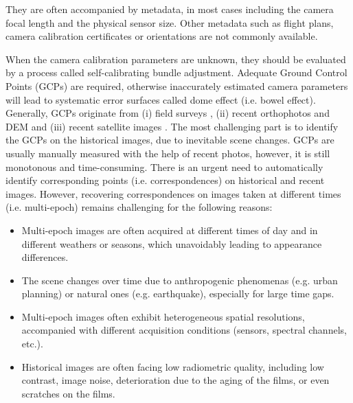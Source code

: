 They are often accompanied by metadata, in most cases including the camera focal length and the physical sensor size. Other metadata such as flight plans, camera calibration certificates or orientations are not commonly available. 
\par
When the camera calibration parameters are unknown, they should be evaluated by a process called self-calibrating bundle adjustment. Adequate Ground Control Points (GCPs) are required, otherwise inaccurately estimated camera parameters will lead to systematic error surfaces called dome effect (i.e. bowel effect).
Generally, GCPs originate from (i) field surveys \cite{micheletti2015application,walstra2004time,cardenal2006use}, (ii) recent orthophotos and DEM \cite{nurminen2015automation,ellis2006measuring,fox2008unlocking} and (iii) recent satellite images \cite{ellis2006measuring,ford2013shoreline}. The most challenging part is to identify the GCPs on the historical images, due to inevitable scene changes. GCPs are usually manually measured with the help of recent photos, however, it is still monotonous and time-consuming. 
There is an urgent need to automatically identify corresponding points (i.e. correspondences) on historical and recent images. However, recovering correspondences on images taken at different times (i.e. multi-epoch) remains challenging for the following reasons:
\begin{itemize}
	\item Multi-epoch images are often acquired at different times of day and in different weathers or seasons, which unavoidably leading to appearance differences.
	\item The scene changes over time due to anthropogenic phenomenas (e.g. urban planning) or natural ones (e.g. earthquake), especially for large time gaps.
	\item Multi-epoch images often exhibit heterogeneous spatial resolutions, accompanied with different acquisition conditions (sensors, spectral channels, etc.).
	\item Historical images are often facing low radiometric quality, including low contrast, image noise, deterioration due to the aging of the films, or even scratches on the films.
\end{itemize}


